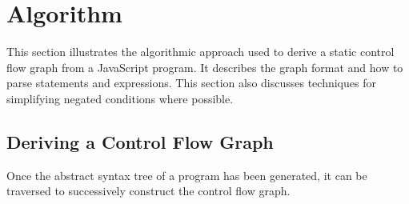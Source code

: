 \section{Algorithm}
\label{sec:algorithm}

This section illustrates the algorithmic approach used to derive a static control flow graph from a JavaScript program. It describes the graph format and how to parse statements and expressions. This section also discusses techniques for simplifying negated conditions where possible.




\subsection{Deriving a Control Flow Graph}

Once the abstract syntax tree of a program has been generated, it can be traversed to successively construct the control flow graph.





